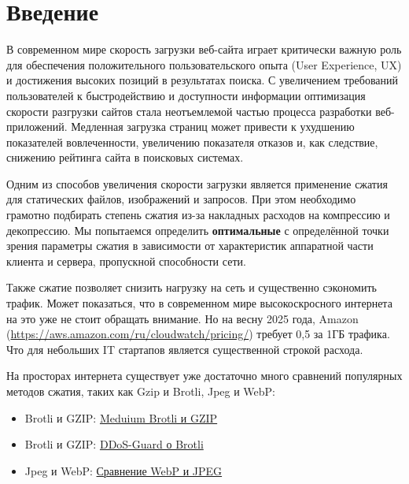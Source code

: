 \documentclass[12pt]{article}
\begin{document}
\tableofcontents

\newpage

\section{Введение}

В современном мире скорость загрузки веб-сайта играет критически важную роль для обеспечения положительного пользовательского опыта (User Experience, UX)
и достижения высоких позиций в результатах поиска. С увеличением требований пользователей к быстродействию и доступности информации оптимизация
скорости разгрузки сайтов стала неотъемлемой частью процесса разработки веб-приложений.
Медленная загрузка страниц может привести к ухудшению показателей вовлеченности, увеличению показателя отказов и, как следствие,
снижению рейтинга сайта в поисковых системах.

Одним из способов увеличения скорости загрузки является применение сжатия для статических файлов, изображений и запросов. При этом необходимо грамотно подбирать степень сжатия
из-за накладных расходов на компрессию и декопрессию. Мы попытаемся определить \textbf{оптимальные} с определённой точки зрения параметры сжатия в зависимости от характеристик
аппаратной части клиента и сервера, пропускной способности сети.

Также сжатие позволяет снизить нагрузку на сеть и существенно сэкономить трафик. Может показаться,
что в современном мире высокоскросного интернета на это уже не стоит обращать внимание.
Но на весну 2025 года, Amazon (\url{https://aws.amazon.com/ru/cloudwatch/pricing/}) требует 0,5\text{\$} за 1ГБ трафика. Что для небольших IT стартапов является существенной строкой расхода.

На просторах интернета существует уже достаточно много сравнений популярных методов сжатия, таких как Gzip и Brotli, Jpeg и WebP:

\begin{itemize}
    \item Brotli и GZIP: \href{https://medium.com/@bansal.suneet/brotli-vs-gzip-compression-surprising-compression-result-brotli-power-782aac2ee29f}{Meduium Brotli и GZIP}
    \item Brotli и GZIP: \href{https://ddos-guard.ru/blog/algoritmy-brotli-recompressiya-i-HSTS-chto-novogo-predlagaet-DDoS-GUARD}{DDoS-Guard о Brotli}
    \item Jpeg и WebP: \href{https://medium.com/@inna_netum/действительно-ли-webp-лучше-jpeg-91639d852035}{Сравнение WebP и JPEG}
\end{itemize}
\end{document}
